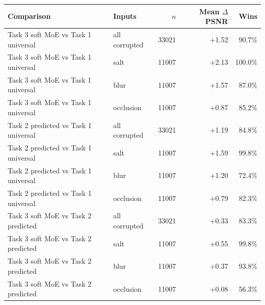 \begin{tabular}{llrrr}
\toprule
Comparison & Inputs & $n$ & Mean $\Delta$PSNR & Wins \\
\midrule
Task 3 soft MoE vs Task 1 universal & all corrupted & 33021 & +1.52 & 90.7\% \\
Task 3 soft MoE vs Task 1 universal & salt & 11007 & +2.13 & 100.0\% \\
Task 3 soft MoE vs Task 1 universal & blur & 11007 & +1.57 & 87.0\% \\
Task 3 soft MoE vs Task 1 universal & occlusion & 11007 & +0.87 & 85.2\% \\
Task 2 predicted vs Task 1 universal & all corrupted & 33021 & +1.19 & 84.8\% \\
Task 2 predicted vs Task 1 universal & salt & 11007 & +1.59 & 99.8\% \\
Task 2 predicted vs Task 1 universal & blur & 11007 & +1.20 & 72.4\% \\
Task 2 predicted vs Task 1 universal & occlusion & 11007 & +0.79 & 82.3\% \\
Task 3 soft MoE vs Task 2 predicted & all corrupted & 33021 & +0.33 & 83.3\% \\
Task 3 soft MoE vs Task 2 predicted & salt & 11007 & +0.55 & 99.8\% \\
Task 3 soft MoE vs Task 2 predicted & blur & 11007 & +0.37 & 93.8\% \\
Task 3 soft MoE vs Task 2 predicted & occlusion & 11007 & +0.08 & 56.3\% \\
\bottomrule
\end{tabular}
